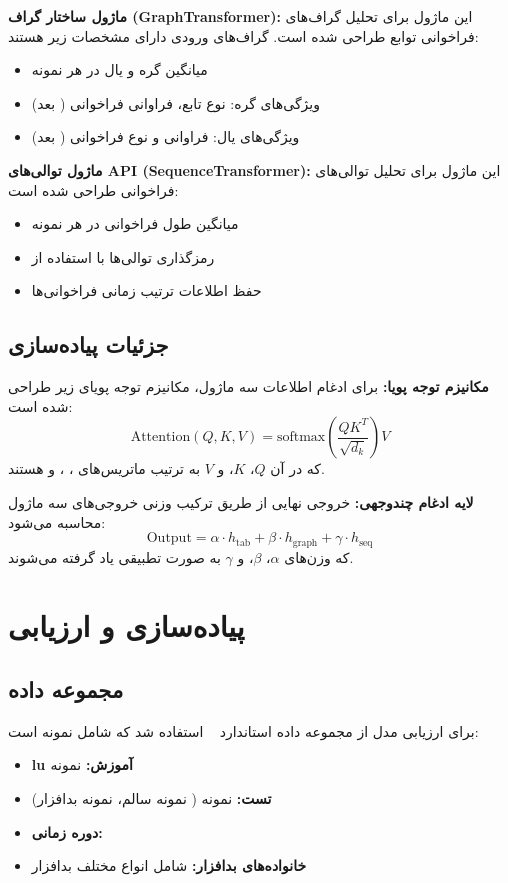 \documentclass[a4paper,11pt]{article}
\begin{document}
\textbf{ماژول ساختار گراف (GraphTransformer):}
این ماژول برای تحلیل گراف‌های فراخوانی توابع طراحی شده است. گراف‌های ورودی دارای مشخصات زیر هستند:
\begin{itemize}
  \item میانگین  گره و  یال در هر نمونه
  \item ویژگی‌های گره: نوع تابع، فراوانی فراخوانی ( بعد)
  \item ویژگی‌های یال: فراوانی و نوع فراخوانی ( بعد)
\end{itemize}

\textbf{ماژول توالی‌های API (SequenceTransformer):}
این ماژول برای تحلیل توالی‌های فراخوانی  طراحی شده است:
\begin{itemize}
  \item میانگین طول  فراخوانی  در هر نمونه
  \item رمزگذاری توالی‌ها با استفاده از 
  \item حفظ اطلاعات ترتیب زمانی فراخوانی‌ها
\end{itemize}

\subsection{جزئیات پیاده‌سازی}
\textbf{مکانیزم توجه پویا:}
برای ادغام اطلاعات سه ماژول، مکانیزم توجه پویای زیر طراحی شده است:
\begin{equation}
\text{Attention}(Q, K, V) = \text{softmax}\left(\frac{QK^T}{\sqrt{d_k}}\right)V
\end{equation}
که در آن $Q$، $K$، و $V$ به ترتیب ماتریس‌های ، ، و  هستند.

\textbf{لایه ادغام چندوجهی:}
خروجی نهایی از طریق ترکیب وزنی خروجی‌های سه ماژول محاسبه می‌شود:
\begin{equation}
\text{Output} = \alpha \cdot h_{\text{tab}} + \beta \cdot h_{\text{graph}} + \gamma \cdot h_{\text{seq}}
\end{equation}
که وزن‌های $\alpha$، $\beta$، و $\gamma$ به صورت تطبیقی یاد گرفته می‌شوند.

\section{پیاده‌سازی و ارزیابی}
\subsection{مجموعه داده}
برای ارزیابی مدل  از مجموعه داده استاندارد ~\cite{Drebin} استفاده شد که شامل  نمونه است:
\begin{itemize}
  \item \textbf{lu آموزش:}  نمونه
  \item \textbf{تست:}  نمونه ( نمونه سالم،  نمونه بدافزار)
  \item \textbf{دوره زمانی:} 
  \item \textbf{خانواده‌های بدافزار:} شامل انواع مختلف بدافزار
\end{itemize}
\end{document}
